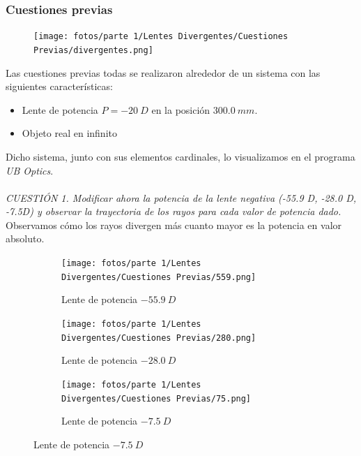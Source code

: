 \documentclass[11pt]{article}
\begin{document}
        \subsubsection{Cuestiones previas}
        \vspace{0.2cm}
        \begin{figure}
            \vspace{-1.1cm}
            \centering
            \texttt{[image: fotos/parte 1/Lentes Divergentes/Cuestiones Previas/divergentes.png]}
        \end{figure}
        
        \noindent Las cuestiones previas todas se realizaron alrededor de un sistema con las siguientes características:
        \begin{itemize}
            \item Lente de potencia $P = -20\ D$ en la posición $300.0\ mm$.
            \item Objeto real en infinito
        \end{itemize}
        
        Dicho sistema, junto con sus elementos cardinales, lo visualizamos en el programa \textit{UB Optics}.\hspace{0cm}\\\hspace{0cm}\\
        
        \textit{CUESTIÓN 1.  Modificar ahora la potencia de la lente negativa (-55.9 D, -28.0 D, -7.5D) y observar la trayectoria de los rayos para cada valor de potencia dado.}\\
        \vspace{0.5cm}Observamos cómo los rayos divergen más cuanto mayor es la potencia en valor absoluto.
        \begin{figure}[ht]
            \vspace{-0.8cm}
            \centering                
            \begin{subfigure}[t]{.49\textwidth}
                \centering\texttt{[image: fotos/parte 1/Lentes Divergentes/Cuestiones Previas/559.png]}
                \caption{Lente de potencia $-55.9\ D$}
            \end{subfigure}
            \begin{subfigure}[t]{.49\textwidth}
                \centering\texttt{[image: fotos/parte 1/Lentes Divergentes/Cuestiones Previas/280.png]}
                \caption{Lente de potencia $-28.0\ D$}
            \end{subfigure}

            \begin{subfigure}[t]{.49\textwidth}
                \centering\texttt{[image: fotos/parte 1/Lentes Divergentes/Cuestiones Previas/75.png]}
                \caption{Lente de potencia $-7.5\ D$}
            \end{subfigure}
        \end{figure}
\end{document}
